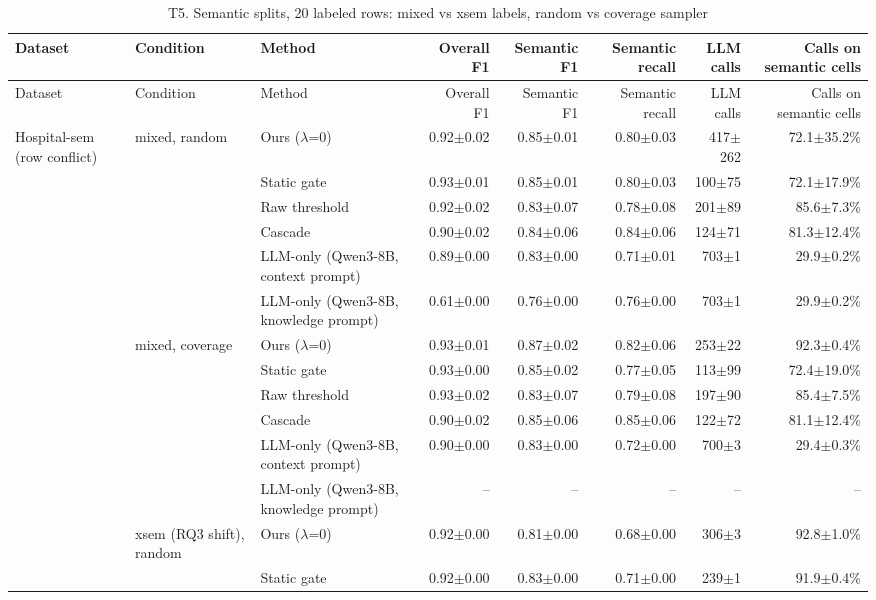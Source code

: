 {\footnotesize
\begin{longtable}{lllrrrrr}
\caption{T5. Semantic splits, 20 labeled rows: mixed vs xsem labels, random vs coverage sampler}\label{tab:T5}\\
\toprule
Dataset & Condition & Method & Overall F1 & Semantic F1 & Semantic recall & LLM calls & Calls on semantic cells \\
\midrule
\endfirsthead
\toprule
Dataset & Condition & Method & Overall F1 & Semantic F1 & Semantic recall & LLM calls & Calls on semantic cells \\
\midrule
\endhead
\bottomrule
\endfoot
Hospital-sem (row conflict) & mixed, random & Ours ($\lambda$=0) & 0.92$\pm$0.02 & 0.85$\pm$0.01 & 0.80$\pm$0.03 & 417$\pm$262 & 72.1$\pm$35.2\% \\
 &  & Static gate & 0.93$\pm$0.01 & 0.85$\pm$0.01 & 0.80$\pm$0.03 & 100$\pm$75 & 72.1$\pm$17.9\% \\
 &  & Raw threshold & 0.92$\pm$0.02 & 0.83$\pm$0.07 & 0.78$\pm$0.08 & 201$\pm$89 & 85.6$\pm$7.3\% \\
 &  & Cascade & 0.90$\pm$0.02 & 0.84$\pm$0.06 & 0.84$\pm$0.06 & 124$\pm$71 & 81.3$\pm$12.4\% \\
 &  & LLM-only (Qwen3-8B, context prompt) & 0.89$\pm$0.00 & 0.83$\pm$0.00 & 0.71$\pm$0.01 & 703$\pm$1 & 29.9$\pm$0.2\% \\
 &  & LLM-only (Qwen3-8B, knowledge prompt) & 0.61$\pm$0.00 & 0.76$\pm$0.00 & 0.76$\pm$0.00 & 703$\pm$1 & 29.9$\pm$0.2\% \\
 & mixed, coverage & Ours ($\lambda$=0) & 0.93$\pm$0.01 & 0.87$\pm$0.02 & 0.82$\pm$0.06 & 253$\pm$22 & 92.3$\pm$0.4\% \\
 &  & Static gate & 0.93$\pm$0.00 & 0.85$\pm$0.02 & 0.77$\pm$0.05 & 113$\pm$99 & 72.4$\pm$19.0\% \\
 &  & Raw threshold & 0.93$\pm$0.02 & 0.83$\pm$0.07 & 0.79$\pm$0.08 & 197$\pm$90 & 85.4$\pm$7.5\% \\
 &  & Cascade & 0.90$\pm$0.02 & 0.85$\pm$0.06 & 0.85$\pm$0.06 & 122$\pm$72 & 81.1$\pm$12.4\% \\
 &  & LLM-only (Qwen3-8B, context prompt) & 0.90$\pm$0.00 & 0.83$\pm$0.00 & 0.72$\pm$0.00 & 700$\pm$3 & 29.4$\pm$0.3\% \\
 &  & LLM-only (Qwen3-8B, knowledge prompt) & -- & -- & -- & -- & -- \\
 & xsem (RQ3 shift), random & Ours ($\lambda$=0) & 0.92$\pm$0.00 & 0.81$\pm$0.00 & 0.68$\pm$0.00 & 306$\pm$3 & 92.8$\pm$1.0\% \\
 &  & Static gate & 0.92$\pm$0.00 & 0.83$\pm$0.00 & 0.71$\pm$0.00 & 239$\pm$1 & 91.9$\pm$0.4\% \\

\end{longtable}}
